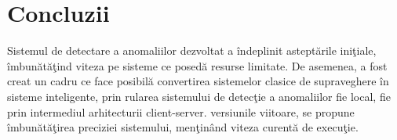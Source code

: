 \documentclass[a4paper,12pt]{report}
\begin{document}
\section{Concluzii}
\quad Sistemul de detectare a anomaliilor dezvoltat a îndeplinit asteptările iniţiale, îmbunătăţind viteza pe sisteme ce posedă resurse limitate. De asemenea, a fost creat un cadru ce face posibilă convertirea sistemelor clasice de supraveghere în sisteme inteligente, prin rularea sistemului de detecţie a anomaliilor fie local, fie prin intermediul arhitecturii client-server. 
 versiunile viitoare, se propune îmbunătăţirea preciziei sistemului, menţinând viteza curentă de execuţie. 

\listoffigures
\listoftables

\end{document}
